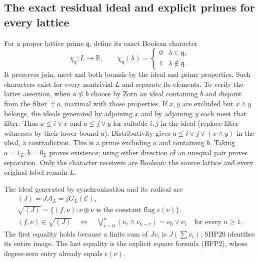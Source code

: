 \subsection{The exact residual ideal and explicit primes for every lattice}

For a proper lattice prime $\mathfrak q$, define its exact Boolean
character
\begin{equation}\tag{HFP9}
 \chi_{\mathfrak q}:L\longrightarrow\mathbb B,
 \qquad\chi_{\mathfrak q}(\lambda)=
       \begin{cases}0&\lambda\in\mathfrak q,\\1&\lambda\notin\mathfrak q.
       \end{cases}
\end{equation}
It preserves join, meet and both bounds by the ideal and prime
properties. Such characters exist for every nontrivial $L$ and
separate its elements. To verify the latter assertion, when
$a\not\le b$ choose by Zorn an ideal containing $b$ and disjoint
from the filter $\uparrow a$, maximal with those properties.
If $x,y$ are excluded but $x\wedge y$ belongs, the ideals
generated by adjoining $x$ and by adjoining $y$ each meet that
filter. Thus $a\le i\vee x$ and $a\le j\vee y$ for suitable
$i,j$ in the ideal (replace filter witnesses by their lower
bound $a$). Distributivity gives
$a\le i\vee j\vee(x\wedge y)$ in the ideal, a contradiction.
This is a prime excluding $a$ and containing $b$. Taking
$a=1_L,b=0_L$ proves existence; using either direction of an
unequal pair proves separation. Only the character receivers
are Boolean: the source lattice and every original label remain $L$.

The ideal generated by synchronization and its radical are
\begin{equation}\tag{HFP10}
\begin{gathered}
 (J)=J\mathcal A_L=jG_L(\mathcal E),\\
 \sqrt{(J)}=\{(f,\nu):\nu\circledast\nu
                    \text{ is the constant flag }\epsilon(\nu)\},\\
 (f,\nu)\in\sqrt{(J)}
 \quad\Longleftrightarrow\quad
 \bigvee_{r=0}^{n}(\nu_r\wedge\nu_{n-r})=\nu_0\vee\nu_1
                         \quad\text{for every }n\ge1.
\end{gathered}
\end{equation}
The first equality holds because a finite sum of $Jv_i$ is
$J(\sum v_i)$; SHP20 identifies its entire image. The last
equality is the explicit square formula (HFP2), whose degree-zero
entry already equals $\epsilon(\nu)$.

